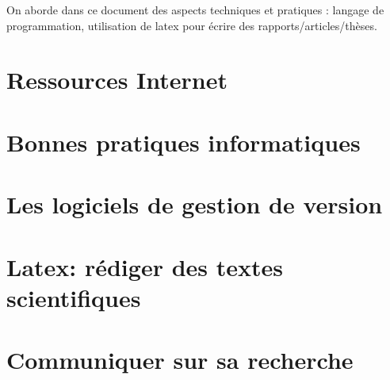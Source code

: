 \documentclass[a4paper,10pt]{book_ad}
\begin{document}
On aborde dans ce document des aspects techniques et pratiques :
langage de programmation, utilisation de latex pour écrire des rapports/articles/thèses.



\tableofcontents 
\newpage

\dominitoc


\chapter{Ressources Internet}
\minitoc



\chapter{Bonnes pratiques	 informatiques}
\minitoc


\chapter{Les logiciels de gestion de version}
\minitoc



\chapter{Latex: rédiger des textes scientifiques}
\minitoc



\chapter{Communiquer sur sa recherche}
\minitoc

\end{document}
